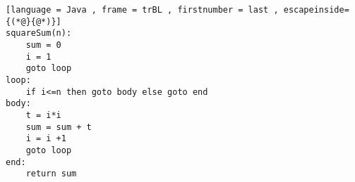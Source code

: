 \begin{lstlisting}[language = Java , frame = trBL , firstnumber = last , escapeinside={(*@}{@*)}]
squareSum(n):
    sum = 0
    i = 1
    goto loop
loop:
    if i<=n then goto body else goto end
body:
    t = i*i
    sum = sum + t
    i = i +1
    goto loop
end:
    return sum
\end{lstlisting}